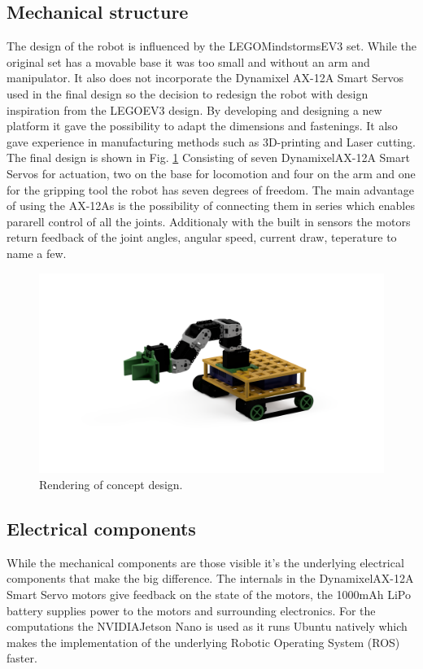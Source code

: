 
\subsection{Mechanical structure}
The design of the robot is influenced by the LEGO\textregistered Mindstorms\textregistered EV3 set. While the original set has a movable base it was too small and without an arm and manipulator. It also does not incorporate the Dynamixel AX-12A Smart Servos used in the final design so the decision to redesign the robot with design inspiration from the LEGO\textregistered EV3 design. By developing and designing a new platform it gave the possibility to adapt the dimensions and fastenings. It also gave experience in manufacturing methods such as 3D-printing and Laser cutting. The final design is shown in Fig. \ref{fig:concept_rendering}
Consisting of seven Dynamixel\textregistered AX-12A Smart Servos for actuation, two on the base for locomotion and four on the arm and one for the gripping tool the robot has seven degrees of freedom. The main advantage of using the AX-12As is the possibility of connecting them in series which enables pararell control of all the joints. Additionaly with the built in sensors the motors return feedback of the joint angles, angular speed, current draw, teperature to name a few.  

\begin{figure}
    \centering
    \includegraphics[width=0.7\columnwidth]{img/rendering.png}
    \caption{Rendering of concept design.}
    \label{fig:concept_rendering}
\end{figure}

\subsection{Electrical components}
While the mechanical components are those visible it's the underlying electrical components that make the big difference. The internals in the Dynamixel\textregistered AX-12A Smart Servo motors give feedback on the state of the motors, the 1000mAh LiPo battery supplies power to the motors and surrounding electronics. For the computations the NVIDIA\textregistered Jetson Nano is used as it runs Ubuntu natively which makes the implementation of the underlying Robotic Operating System (ROS) \cite{ros} faster. 


